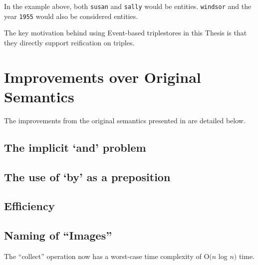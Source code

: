 \documentclass[../main.tex]{subfiles}
\begin{document}
In the example above, both \texttt{susan} and \texttt{sally} would be entities.  \texttt{windsor} and the year \texttt{1955} would also be considered entities.

The key motivation behind using Event-based triplestores in this Thesis is that they directly support reification on triples\cite{frostagboola2014}.

\section{Improvements over Original Semantics}

The improvements from the original semantics presented in \cite{frost2014demonstration} \cite{frostagboola2014} are detailed below.

\subsection{The implicit `and' problem}

\subsection{The use of `by' as a preposition}

\subsection{Efficiency}

\subsection{Naming of ``Images''}

The ``collect'' operation now has a worst-case time complexity of O$(n$ log $n)$ time.
\end{document}
